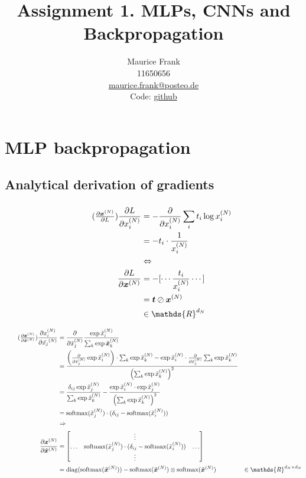 \documentclass{article}
\title{Assignment 1. MLPs, CNNs and Backpropagation}
\author{%
  Maurice Frank\\
  11650656\\
  \href{mailto:maurice.frank@posteo.de}{maurice.frank@posteo.de} \\
  Code: \href{https://github.com/morris-frank/uvadlc_practicals_2019/tree/master/assignment_1/code}{github}
}
\newcommand\bM[1]{\ensuremath{\begin{bmatrix}#1\end{bmatrix}}}
\newcommand\·{\ensuremath{\cdot}}
\newcommand\…{\ensuremath{\dots}}
\renewcommand\t{\ensuremath{\times}}
\DeclareMathOperator{\soft}{softmax}
\DeclareMathOperator{\diag}{diag}
\newcommand{\⇔}{\ensuremath{\Leftrightarrow}}
\newcommand{\⇐}{\ensuremath{\Leftarrow}}
\newcommand{\⇒}{\ensuremath{\Rightarrow}}
\newcommand\f[2]{\ensuremath{\frac{#1}{#2}}}
\newcommand\pf[2]{\ensuremath{\frac{\partial {#1}}{\partial {#2}}}}
\newcommand*{\B}[1]{\ifmmode\bm{#1}\else\textbf{#1}\fi}
\newcommand\1{\ensuremath{\mathds{1}}}
\newcommand\ℝ{\ensuremath{\mathds{R}}}
\begin{document}
\maketitle
\section{MLP backpropagation}
\subsection{Analytical derivation of gradients}
\subsubsection{}
\begin{align*}
  \tag{$\pf{\B{x}^{(N)}}{L}$}
  \pf{L}{x_i^{(N)}}
  &= -\pf{}{x_i^{(N)}}\sum_i t_i \log x_i^{(N)}\\
  &= -t_i\·\f{1}{x_i^{(N)}}\\
  &\⇔\\
  \pf{L}{\B{x}^{(N)}}
  &= -[\dotsb \f{t_i}{x_i^{(N)}}\dotsb]\\
  &= \B{t}\oslash\B{x}^{(N)}\\
  &\in\ℝ^{d_N}
\end{align*}

\begin{align*}
  \tag{$\pf{\B{x}^{(N)}}{\tilde{\B{x}}^{(N)}}$}
  \pf{x_i^{(N)}}{\tilde{x_j}^{(N)}}
  &= \pf{}{\tilde{x}_j^{(N)}}\f{\exp{\tilde{x}_i^{(N)}}}{\sum_k \exp{\tilde{\B{x}}_k^{(N)}}}\\
  &= \f{\left(\pf{}{\tilde{x}^{(N)}_j}\exp{\tilde{x}^{(N)}_i}\right)\·\sum_k\exp{\tilde{x}^{(N)}_k} - \exp{\tilde{x}^{(N)}_i}\·\pf{}{\tilde{x}^{(N)}_j}\sum_k\exp{\tilde{x}^{(N)}_k}}{\left(\sum_k\exp{\tilde{x}^{(N)}_k}\right)^2}\\
  &= \f{\delta_{ij}\exp{\tilde{x}^{(N)}_j}}{\sum_k\exp{\tilde{x}^{(N)}_k}} - \f{\exp{\tilde{x}^{(N)}_i}\·\exp{\tilde{x}^{(N)}_j}}{\left(\sum_k\exp{\tilde{x}^{(N)}_k}\right)^2}\\
  &= \soft(\tilde{x}^{(N)}_j)\·(\delta_{ij} - \soft(\tilde{x}^{(N)}_i))\\
  &\Rightarrow\\
  \pf{\B{x}^{(N)}}{\tilde{\B{x}}^{(N)}} &= \bM{& \vdots &\\\hdots & \soft(\tilde{x}^{(N)}_j)\·(\delta_{ij} - \soft(\tilde{x}^{(N)}_i)) & \hdots\\ & \vdots &}\\
  &= \diag(\soft(\tilde{\B{x}}^{(N)})) -\soft(\tilde{\B{x}}^{(N)})\otimes \soft(\tilde{\B{x}}^{(N)})
  &\in\ℝ^{d_N\t d_N}
\end{align*}
\end{document}
